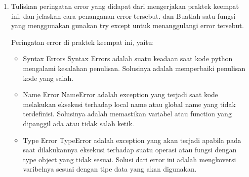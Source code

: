 \begin{enumerate}
	\item Tuliskan  peringatan  error  yang  didapat  dari  mengerjakan  praktek  keempat  ini, dan  jelaskan  cara  penanganan  error  tersebut.   dan  Buatlah  satu  fungsi  yang menggunakan gunakan try except untuk menanggulangi error tersebut.
	
	Peringatan error di praktek keempat ini, yaitu:
	\begin{itemize}
		\item Syntax Errors
		Syntax Errors adalah suatu keadaan saat kode python mengalami kesalahan penulisan. Solusinya adalah memperbaiki penulisan kode yang salah.
		
		\item Name Error
		NameError adalah exception yang terjadi saat kode melakukan eksekusi terhadap local name atau global name yang tidak terdefinisi. Solusinya adalah memastikan variabel atau function yang dipanggil ada atau tidak salah ketik.
		
		\item Type Error
		TypeError adalah exception yang akan terjadi apabila pada saat dilakukannya eksekusi terhadap suatu operasi atau fungsi dengan type object yang tidak sesuai. Solusi dari error ini adalah mengkoversi varibelnya sesuai dengan tipe data yang akan digunakan.
	\end{itemize}

\end{enumerate}

